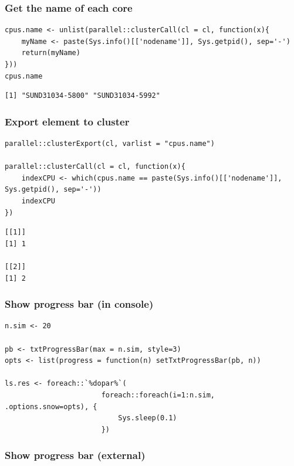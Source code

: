 \documentclass{article}
\begin{document}
\subsubsection{Get the name of each core}
\label{sec:orgd6deb8a}

\lstset{language=r,label= ,caption= ,captionpos=b,numbers=none}
\begin{lstlisting}
cpus.name <- unlist(parallel::clusterCall(cl = cl, function(x){
	myName <- paste(Sys.info()[['nodename']], Sys.getpid(), sep='-')
	return(myName)
}))
cpus.name
\end{lstlisting}

\begin{verbatim}
[1] "SUND31034-5800" "SUND31034-5992"
\end{verbatim}

\subsubsection{Export element to cluster}
\label{sec:org97f52a4}
\lstset{language=r,label= ,caption= ,captionpos=b,numbers=none}
\begin{lstlisting}
parallel::clusterExport(cl, varlist = "cpus.name")

parallel::clusterCall(cl = cl, function(x){
	indexCPU <- which(cpus.name == paste(Sys.info()[['nodename']], Sys.getpid(), sep='-'))
	indexCPU
})
\end{lstlisting}

\begin{verbatim}
[[1]]
[1] 1

[[2]]
[1] 2
\end{verbatim}

\subsubsection{Show progress bar (in console)}
\label{sec:org431023b}

\lstset{language=r,label= ,caption= ,captionpos=b,numbers=none}
\begin{lstlisting}
n.sim <- 20

pb <- txtProgressBar(max = n.sim, style=3)
opts <- list(progress = function(n) setTxtProgressBar(pb, n))

ls.res <- foreach::`%dopar%`(
					   foreach::foreach(i=1:n.sim, .options.snow=opts), {
						   Sys.sleep(0.1)
					   })
\end{lstlisting}

\subsubsection{Show progress bar (external)}
\label{sec:org7722e05}
\end{document}
